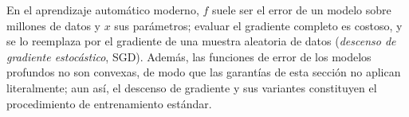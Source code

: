 \documentclass[11pt, a4paper]{article}
\begin{document}
\obs En el aprendizaje automático moderno, $f$ suele ser el error de un modelo sobre millones de datos y $x$ sus parámetros; evaluar el gradiente completo es costoso, y se lo reemplaza por el gradiente de una muestra aleatoria de datos (\emph{descenso de gradiente estocástico}, SGD). Además, las funciones de error de los modelos profundos no son convexas, de modo que las garantías de esta sección no aplican literalmente; aun así, el descenso de gradiente y sus variantes constituyen el procedimiento de entrenamiento estándar.
\end{document}
